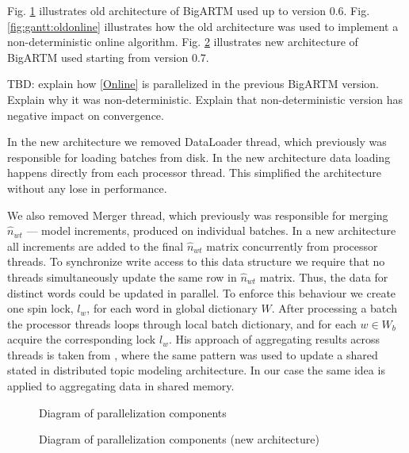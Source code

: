 \documentclass[russian,english]{llncs}
\begin{document}
Fig. \ref{fig:diagramm_artm_core} illustrates old architecture of BigARTM used up to version 0.6.
Fig. \ref{fig:gantt:oldonline} illustrates how the old architecture was used to implement a non-deterministic online algorithm.
Fig. \ref{fig:diagramm_artm_core_v07} illustrates new architecture of BigARTM used starting from version 0.7.


TBD: explain how \ref{Online} is parallelized in the previous BigARTM version.
Explain why it was non-deterministic.
Explain that non-deterministic version has negative impact on convergence.

In the new architecture we removed DataLoader thread,
which previously was responsible for loading batches from disk.
In the new architecture data loading happens directly from each processor thread.
This simplified the architecture without any lose in performance.

We also removed Merger thread, which previously was responsible
for merging $\hat n_{wt}$ --- model increments, produced on individual batches.
In a new architecture all increments are added to the final $\hat n_{wt}$ matrix
concurrently from processor threads.
To synchronize write access to this data structure we require that
no threads simultaneously update the same row in $\hat n_{wt}$ matrix.
Thus, the data for distinct words could be updated in parallel.
To enforce this behaviour we create one spin lock, $l_w$, for each word in global dictionary $W$.
After processing a batch the processor threads loops through local batch dictionary,
and for each $w \in W_b$ acquire the corresponding lock $l_w$.
His approach of aggregating results across threads is taken from \cite{smola10architecture},
where the same pattern was used to update a shared stated in distributed topic modeling architecture.
In our case the same idea is applied to aggregating data in shared memory.

\begin{figure}[t]
\begin{centering}
\caption{Diagram of parallelization components}
\label{fig:diagramm_artm_core}
\end{centering}
\end{figure}

\begin{figure}[t]
\begin{centering}
\caption{Diagram of parallelization components (new architecture)}
\label{fig:diagramm_artm_core_v07}
\end{centering}
\end{figure}
\end{document}
